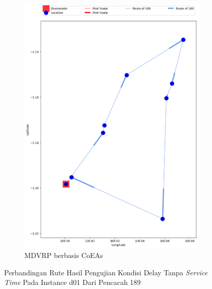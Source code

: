 \begin{figure}[H]
	\centering
	\begin{subfigure}[t]{\textwidth}
		\centering
		\includegraphics[width=\textwidth]{Resources/Images/delayed_1/real_m15_n100_delayed_1_189_coes}
		\caption{MDVRP berbasis CoEAs}
		\label{fig:real_m15_n100_delayed_1_189_coes}
	\end{subfigure}
	\caption{Perbandingan Rute Hasil Pengujian Kondisi Delay Tanpa \textit{Service Time} Pada Instance d01 Dari Pencacah 189}
	\label{fig:real_m15_n100_delayed_1_189}
\end{figure}


